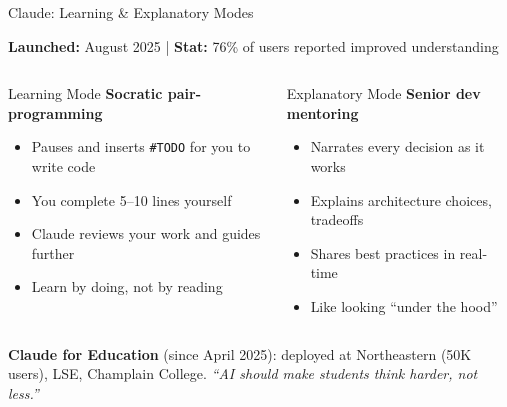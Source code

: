 \documentclass[aspectratio=169]{beamer}
\begin{document}
\begin{frame}{Claude: Learning \& Explanatory Modes}

\textbf{\color{violet1}Launched:} August 2025 \quad|\quad
\textbf{\color{violet1}Stat:} 76\% of users reported improved understanding

\bigskip
\begin{columns}[T]
\begin{block}{Learning Mode}
\textbf{Socratic pair-programming}
\begin{itemize}
  \item Pauses and inserts \texttt{\#TODO} for you to write code
  \item You complete 5--10 lines yourself
  \item Claude reviews your work and guides further
  \item Learn by doing, not by reading
\end{itemize}
\end{block}

\begin{block}{Explanatory Mode}
\textbf{Senior dev mentoring}
\begin{itemize}
  \item Narrates every decision as it works
  \item Explains architecture choices, tradeoffs
  \item Shares best practices in real-time
  \item Like looking ``under the hood''
\end{itemize}
\end{block}
\end{columns}

\bigskip
\textbf{\color{violet1}Claude for Education} (since April 2025):
deployed at Northeastern (50K users), LSE, Champlain College.
\textit{``AI should make students think harder, not less.''}
\end{frame}
\end{document}
